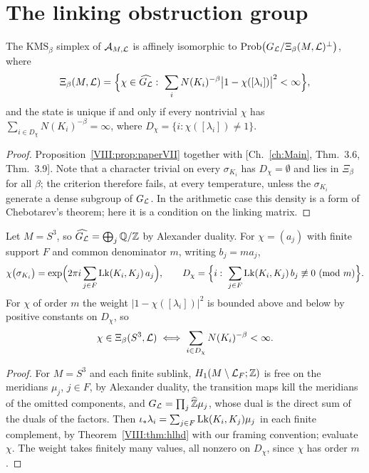 \section{The linking obstruction group}\label{VIII:sec:obstruction}

\begin{theorem}\label{VIII:thm:kms}
The $\mathrm{KMS}_\beta$ simplex of $\mathcal{A}_{M,\mathcal{L}}$ is affinely isomorphic to
$\mathrm{Prob}\bigl(G_{\mathcal{L}}/\Xi_\beta(M,\mathcal{L})^\perp\bigr)$, where
\begin{equation}\label{VIII:eq:Xi}
\Xi_\beta(M,\cL)=\Bigl\{\chi\in\widehat{G_\cL}:\ \sum_iN(K_i)^{-\beta}\bigl|1-\chi([\lambda_i])\bigr|^2<\infty\Bigr\},
\end{equation}
and the state is unique if and only if every nontrivial $\chi$ has
$\sum_{i\in D_\chi}N(K_i)^{-\beta}=\infty$, where $D_\chi=\{i:\chi([\lambda_i])\ne1\}$.
\end{theorem}

\begin{proof}
Proposition~\ref{VIII:prop:paperVII} together with [Ch.~\ref{ch:Main}, Thm.~3.6, Thm.~3.9]. Note that a
character trivial on every $\sigma_{K_i}$ has $D_\chi=\emptyset$ and lies in $\Xi_\beta$ for
all $\beta$; the criterion therefore fails, at every temperature, unless the $\sigma_{K_i}$
generate a dense subgroup of $G_{\mathcal{L}}$. In the arithmetic case this density is a form of
Chebotarev's theorem; here it is a condition on the linking matrix.
\end{proof}

\begin{theorem}\label{VIII:thm:linking}
Let $M=S^3$, so $\widehat{G_{\mathcal{L}}}=\bigoplus_j\mathbb{Q}/\mathbb{Z}$ by Alexander duality. For $\chi=(a_j)$ with
finite support $F$ and common denominator $m$, writing $b_j=ma_j$,
\begin{equation}\label{VIII:eq:link}
\chi\bigl(\sigma_{K_i}\bigr)=\exp\Bigl(2\pi i\sum_{j\in F}\Lk(K_i,K_j)\,a_j\Bigr),
\qquad
D_\chi=\Bigl\{i:\ \sum_{j\in F}\Lk(K_i,K_j)\,b_j\not\equiv0\ (\mathrm{mod}\ m)\Bigr\}.
\end{equation}
For $\chi$ of order $m$ the weight $|1-\chi([\lambda_i])|^2$ is bounded above and below by
positive constants on $D_\chi$, so
\[
\chi\in\Xi_\beta(S^3,\mathcal{L})\iff\sum_{i\in D_\chi}N(K_i)^{-\beta}<\infty .
\]
\end{theorem}

\begin{proof}
For $M=S^3$ and each finite sublink, $H_1(M\setminus\mathcal{L}_F;\mathbb{Z})$ is free on the meridians
$\mu_j$, $j\in F$, by Alexander duality, the transition maps kill the meridians of the
omitted components, and $G_{\mathcal{L}}=\prod_j\widehat{\mathbb{Z}}\mu_j$, whose dual is the direct sum of the duals of
the factors. Then $\iota_*\lambda_i=\sum_{j\in F}\operatorname{Lk}(K_i,K_j)\mu_j$ in each finite complement,
by Theorem~\ref{VIII:thm:hlhd} with our framing convention; evaluate $\chi$. The weight takes
finitely many values, all nonzero on $D_\chi$, since $\chi$ has order $m$.
\end{proof}

